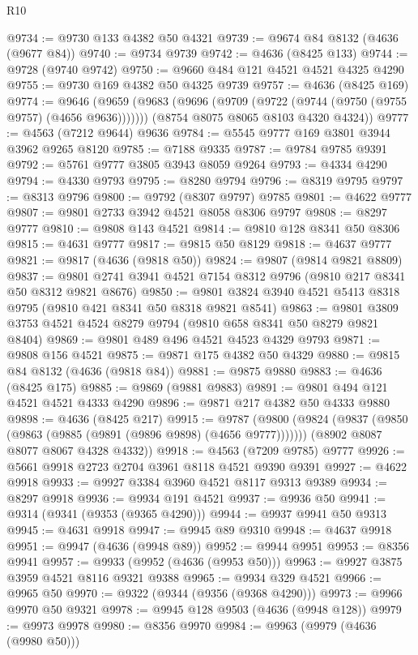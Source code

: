 \begin{lexlean}{R10}
\begin{coremodule}
@9734 := @9730 @133 @4382 @50 @4321
@9739 := @9674 @84 @8132 (@4636 (@9677 @84))
@9740 := @9734 @9739
@9742 := @4636 (@8425 @133)
@9744 := @9728 (@9740 @9742)
@9750 := @9660 @484 @121 @4521 @4521 @4325 @4290
@9755 := @9730 @169 @4382 @50 @4325 @9739
@9757 := @4636 (@8425 @169)
@9774 := @9646
    (@9659
      (@9683 (@9696 (@9709 (@9722 (@9744 (@9750 (@9755 @9757) (@4656 @9636)))))))
      (@8754 @8075 @8065 @8103 @4320 @4324))
@9777 := @4563 (@7212 @9644) @9636
@9784 := @5545 @9777 @169 @3801 @3944 @3962 @9265 @8120
@9785 := @7188 @9335
@9787 := @9784 @9785 @9391
@9792 := @5761 @9777 @3805 @3943 @8059 @9264
@9793 := @4334 @4290
@9794 := @4330 @9793
@9795 := @8280 @9794
@9796 := @8319 @9795
@9797 := @8313 @9796
@9800 := @9792 (@8307 @9797) @9785
@9801 := @4622 @9777
@9807 := @9801 @2733 @3942 @4521 @8058 @8306 @9797
@9808 := @8297 @9777
@9810 := @9808 @143 @4521
@9814 := @9810 @128 @8341 @50 @8306
@9815 := @4631 @9777
@9817 := @9815 @50 @8129
@9818 := @4637 @9777
@9821 := @9817 (@4636 (@9818 @50))
@9824 := @9807 (@9814 @9821 @8809)
@9837 := @9801 @2741 @3941 @4521 @7154 @8312 @9796 (@9810 @217 @8341 @50 @8312 @9821 @8676)
@9850 := @9801 @3824 @3940 @4521 @5413 @8318 @9795 (@9810 @421 @8341 @50 @8318 @9821 @8541)
@9863 := @9801 @3809 @3753 @4521 @4524 @8279 @9794 (@9810 @658 @8341 @50 @8279 @9821 @8404)
@9869 := @9801 @489 @496 @4521 @4523 @4329 @9793
@9871 := @9808 @156 @4521
@9875 := @9871 @175 @4382 @50 @4329
@9880 := @9815 @84 @8132 (@4636 (@9818 @84))
@9881 := @9875 @9880
@9883 := @4636 (@8425 @175)
@9885 := @9869 (@9881 @9883)
@9891 := @9801 @494 @121 @4521 @4521 @4333 @4290
@9896 := @9871 @217 @4382 @50 @4333 @9880
@9898 := @4636 (@8425 @217)
@9915 := @9787
    (@9800
      (@9824 (@9837 (@9850 (@9863 (@9885 (@9891 (@9896 @9898) (@4656 @9777)))))))
      (@8902 @8087 @8077 @8067 @4328 @4332))
@9918 := @4563 (@7209 @9785) @9777
@9926 := @5661 @9918 @2723 @2704 @3961 @8118 @4521 @9390 @9391
@9927 := @4622 @9918
@9933 := @9927 @3384 @3960 @4521 @8117 @9313 @9389
@9934 := @8297 @9918
@9936 := @9934 @191 @4521
@9937 := @9936 @50
@9941 := @9314 (@9341 (@9353 (@9365 @4290)))
@9944 := @9937 @9941 @50 @9313
@9945 := @4631 @9918
@9947 := @9945 @89 @9310
@9948 := @4637 @9918
@9951 := @9947 (@4636 (@9948 @89))
@9952 := @9944 @9951
@9953 := @8356 @9941
@9957 := @9933 (@9952 (@4636 (@9953 @50)))
@9963 := @9927 @3875 @3959 @4521 @8116 @9321 @9388
@9965 := @9934 @329 @4521
@9966 := @9965 @50
@9970 := @9322 (@9344 (@9356 (@9368 @4290)))
@9973 := @9966 @9970 @50 @9321
@9978 := @9945 @128 @9503 (@4636 (@9948 @128))
@9979 := @9973 @9978
@9980 := @8356 @9970
@9984 := @9963 (@9979 (@4636 (@9980 @50)))

\end{coremodule}
\end{lexlean}
